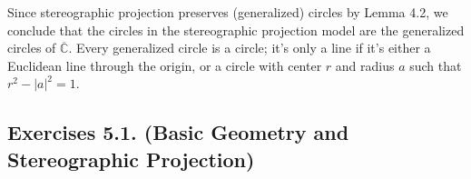 \documentclass[leqno]{book}
\begin{document}
Since stereographic projection preserves (generalized) circles by Lemma 4.2, we conclude that the circles in the stereographic projection model are the generalized circles of $\overline{\mathbb C}$.  Every generalized circle is a circle; it's only a line if it's either a Euclidean line through the origin, or a circle with center $r$ and radius $a$ such that $r^2-|a|^2=1$.

\subsection*{Exercises 5.1. (Basic Geometry and Stereographic Projection)} %
\end{document}
